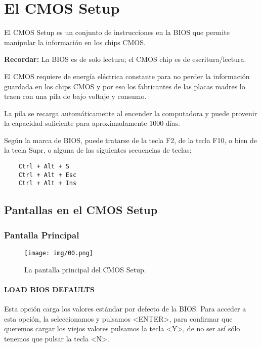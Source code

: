 \section{El CMOS Setup}{\label{sec:cmossetup}}

	El CMOS Setup es un conjunto de instrucciones en la BIOS que permite
	manipular la información en los chips CMOS.

	{\bf Recordar:} La BIOS es de solo lectura; el CMOS chip es de escritura/lectura.

	El CMOS requiere de energía eléctrica constante para no perder la
	información guardada en los chips CMOS y por eso los fabricantes de las
	placas madres lo traen con una pila de bajo voltaje y consumo.

	La pila se recarga automáticamente al encender la computadora y puede
	provenir la capacidad suficiente para aproximadamente 1000 días.

	Según la marca de BIOS, puede tratarse de la tecla F2, de la tecla F10, o
	bien de la tecla Supr, o alguna de las siguientes secuencias de teclas: 

	\begin{verbatim}
	Ctrl + Alt + S 
	Ctrl + Alt + Esc 
	Ctrl + Alt + Ins 
	\end{verbatim}
	\newpage

	\subsection{Pantallas en el CMOS Setup}\label{sub:pantallas en el cmos setup}

		\subsubsection{Pantalla Principal}\label{sub:pantalla principal}
			
			\begin{figure}[H]
				\centering
					\texttt{[image: img/00.png]}
				\caption{La pantalla principal del CMOS Setup.}
			\end{figure}

			\paragraph{LOAD BIOS DEFAULTS}\label{LOAD BIOS DEFAULTS}
				
			   Esta opción carga los valores estándar por defecto de la BIOS.
			   Para acceder a esta opción, la seleccionamos y pulsamos <ENTER>,
			   para confirmar que queremos cargar los viejos valores pulsamos
			   la tecla <Y>, de no ser así sólo tenemos que pulsar la tecla
			   <N>.

